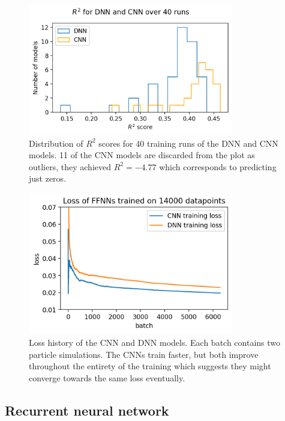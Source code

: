 \documentclass[a4paper]{article}
\begin{document}
\begin{figure}
    \centering
    \includegraphics[width=0.8\textwidth]{Figures/dnn_cnn_hist.png}
    \caption{Distribution of $R^2$ scores for 40 training runs of the DNN and CNN models. 11 of the CNN models are discarded from the plot as outliers, they achieved $R^2 = -4.77$ which corresponds to predicting just zeros.}
    \label{fig:hist_cnn_dnn}
\end{figure}

\begin{figure}
    \centering
    \includegraphics[width=0.8\textwidth]{Figures/train_dnn_cnn.png}
    \caption{Loss history of the CNN and DNN models. Each batch contains two particle simulations. The CNNs train faster, but both improve throughout the entirety of the training which suggests they might converge towards the same loss eventually.}
    \label{fig:train_cnn_dnn}
\end{figure}

\subsection{Recurrent neural network}
\end{document}
